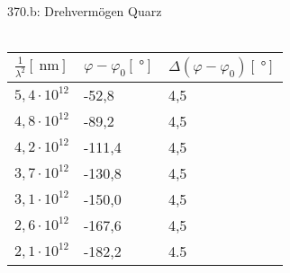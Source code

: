 \documentclass[a4paper,12pt]{article}
\begin{document}
\noindent 370.b: Drehvermögen Quarz\\\\
\begin{tabular}{ lll }
        $\tfrac{1}{\lambda ^2}\left[\SI{}{\nm}\right]$ & $\varphi -\varphi _0\left[\SI{}{\degree}\right]$ & $\Delta \left(\varphi -\varphi _0\right) \left[\SI{}{\degree}\right]$ \\
	\hline
        $5,4\cdot 10^{12}$ & -52,8 & 4,5 \\
        $4,8\cdot 10^{12}$ & -89,2 & 4,5 \\
        $4,2\cdot 10^{12}$ & -111,4 & 4,5 \\
        $3,7\cdot 10^{12}$ & -130,8 & 4,5 \\
        $3,1\cdot 10^{12}$ & -150,0 & 4,5 \\
        $2,6\cdot 10^{12}$ & -167,6 & 4,5 \\
        $2,1\cdot 10^{12}$ & -182,2 & 4.5
\end{tabular}
\end{document}

